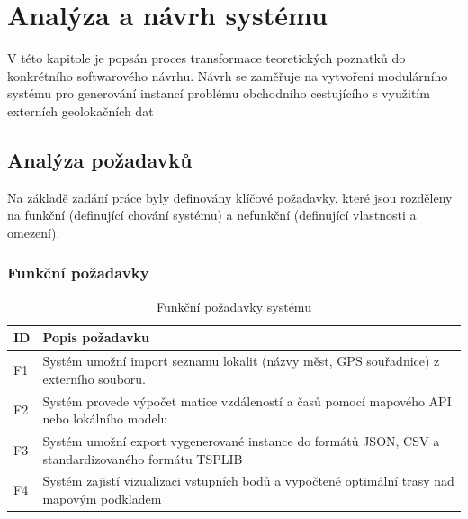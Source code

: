 \chapter{Analýza a návrh systému}
V této kapitole je popsán proces transformace teoretických poznatků do konkrétního softwarového návrhu. Návrh se zaměřuje na vytvoření modulárního systému pro generování instancí problému obchodního cestujícího s využitím externích geolokačních dat %

\section{Analýza požadavků}
Na základě zadání práce byly definovány klíčové požadavky, které jsou rozděleny na funkční (definující chování systému) a nefunkční (definující vlastnosti a omezení).

\subsection{Funkční požadavky}
\begin{table}[ht]
\centering
\begin{tabular}{|l|p{10cm}|}
\hline
\textbf{ID} & \textbf{Popis požadavku} \\ \hline
F1 & Systém umožní import seznamu lokalit (názvy měst, GPS souřadnice) z externího souboru. \\ \hline
F2 & Systém provede výpočet matice vzdáleností a časů pomocí mapového API nebo lokálního modelu %
\\ \hline
F3 & Systém umožní export vygenerované instance do formátů JSON, CSV a standardizovaného formátu TSPLIB %
\\ \hline
F4 & Systém zajistí vizualizaci vstupních bodů a vypočtené optimální trasy nad mapovým podkladem %
\\ \hline
\end{tabular}
\caption{Funkční požadavky systému}
\end{table}

\clearpage


